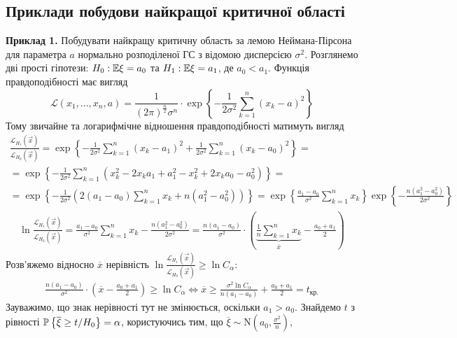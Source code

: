 \subsection{Приклади побудови найкращої критичної області}
\noindent\textbf{Приклад 1.}\label{nko:ex1} Побудувати найкращу критичну область за лемою Неймана-Пірсона
для параметра $a$ нормально розподіленої ГС з відомою дисперсією $\sigma^2$. Розглянемо дві прості гіпотези:
$H_0 : \E\xi = a_0$ та $H_1 : \E\xi = a_1$, де $a_0 < a_1$. Функція правдоподібності має вигляд
$$ \mathcal{L}(x_1, ..., x_n, a) = 
\frac{1}{(2\pi)^{\frac{n}{2}} \sigma^n} \cdot \exp\left\{-\frac{1}{2\sigma^2}\sum\limits_{k=1}^n (x_k - a)^2\right\}$$
Тому звичайне та логарифмічне відношення правдоподібності матимуть вигляд
\begin{gather*}
    \frac{\mathcal{L}_{H_1}(\vec{x})}{\mathcal{L}_{H_0}(\vec{x})} = 
    \exp\left\{ -\frac{1}{2\sigma^2}\sum\limits_{k=1}^n (x_k - a_1)^2 + \frac{1}{2\sigma^2}\sum\limits_{k=1}^n (x_k - a_0)^2\right\} = \\
    = \exp\left\{ -\frac{1}{2\sigma^2}\sum\limits_{k=1}^n \left(x_k^2 - 2x_k a_1 + a_1^2 - x_k^2 + 2x_k a_0 - a_0^2\right)\right\} = \\
    = \exp\left\{ -\frac{1}{2\sigma^2} \left( 2(a_1 - a_0) \sum\limits_{k=1}^n x_k + n(a_1^2 - a_0^2)\right)\right\} = 
    \exp\left\{\frac{a_1 - a_0}{\sigma^2}\sum\limits_{k=1}^n x_k \right\}
    \exp\left\{-\frac{n(a_1^2 - a_0^2)}{2\sigma^2}\right\}
\end{gather*}
\begin{gather*}
    \ln \frac{\mathcal{L}_{H_1}(\vec{x})}{\mathcal{L}_{H_0}(\vec{x})} = 
    \frac{a_1 - a_0}{\sigma^2}\sum\limits_{k=1}^n x_k - \frac{n(a_1^2 - a_0^2)}{2\sigma^2} = 
    \frac{n(a_1 - a_0)}{\sigma^2}\cdot\left(\underbrace{\frac{1}{n}\sum\limits_{k=1}^n x_k}_{\overline{x}} - \frac{a_0 + a_1}{2} \right)
\end{gather*}
Розв'яжемо відносно $\overline{x}$ нерівність $\ln \frac{\mathcal{L}_{H_1}(\vec{x})}{\mathcal{L}_{H_0}(\vec{x})} \geq \ln C_{\alpha}$:
\begin{gather*}
    \frac{n(a_1 - a_0)}{\sigma^2}\cdot \left(\overline{x} - \frac{a_0 + a_1}{2}\right) \geq \ln C_{\alpha} \Leftrightarrow
    \overline{x} \geq \frac{\sigma^2 \ln C_{\alpha}}{n(a_1 - a_0)} + \frac{a_0 + a_1}{2} = t_{\text{кр.}}
\end{gather*}
Зауважимо, що знак нерівності тут не змінюється, оскільки $a_1 > a_0$. Знайдемо $t$ з рівності
$\P \left\{\overline{\xi} \geq t / H_0 \right\} = \alpha$, користуючись тим, що $\overline{\xi} \sim \mathrm{N}\left(a_0, \frac{\sigma^2}{n}\right)$, 

